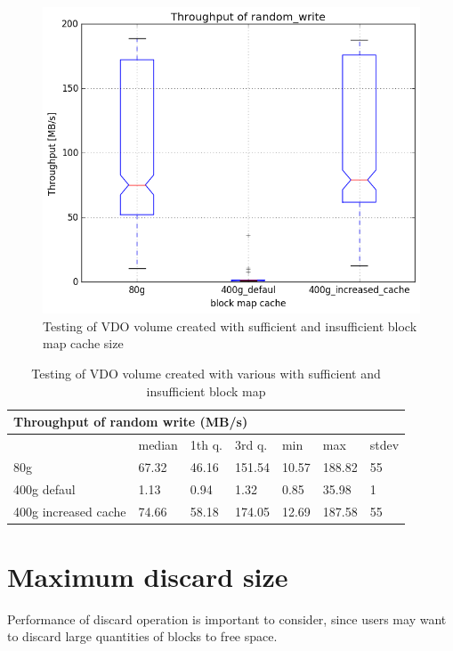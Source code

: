 \documentclass[
  color, %
  table, %
  lof,   %
  lot,   %
]{fithesis3}
\begin{document}
\begin{figure}
        \centering
        \includegraphics[width=\textwidth]{../results/block_map_cache/report/random_write1_compare_boxplots}
\caption[Block map cache size testing]{Testing of VDO volume created with sufficient and insufficient block map cache size}
\label{fig:blockmap-boxplots}
\end{figure}

\begin{table}
\centering
\begin{tabular}{|l|l|l|l|l|l|l|}
        \hline
        \multicolumn{7}{|l|}{Throughput of random write (MB/s)} \\ \hline
         & median & 1th q. & 3rd q. & min & max & stdev \\ \hline 
80g & 67.32 & 46.16 & 151.54 & 10.57 & 188.82 & 55 \\ \hline
400g defaul & 1.13 & 0.94 & 1.32 & 0.85 & 35.98 & 1 \\ \hline
400g increased cache & 74.66 & 58.18 & 174.05 & 12.69 & 187.58 & 55 \\ \hline
\end{tabular}
\caption{Testing of VDO volume created with various with sufficient and insufficient block map}
\label{tab:blockmap-tab}
\end{table}



\section{Maximum discard size}
Performance of discard operation is important to consider, since users may want to discard large quantities of blocks to free space.
\end{document}
